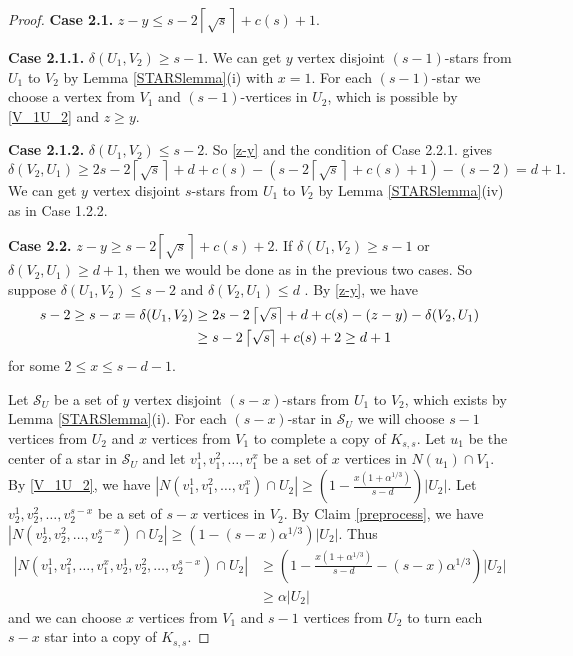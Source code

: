 \documentclass[oneside,12pt]{memoir}
\newcommand{\croot}[1]{\left\lceil\sqrt{#1}\right\rceil}
\begin{document}
\begin{proof}

\textbf{Case 2.1.} $z-y\leq s-2\croot{s}+c(s)+1$.  %

\textbf{Case 2.1.1.} $\delta(U_1,V_2)\geq s-1$. We can get $y$ vertex disjoint $(s-1)$-stars from $U_1$ to $V_2$ by Lemma \ref{STARSlemma}(i) with $x=1$.  For each $(s-1)$-star we choose a vertex from $V_1$ and $(s-1)$-vertices in $U_2$, which is possible by \eqref{V_1U_2} and $z\geq y$.

\textbf{Case 2.1.2.} $\delta(U_1,V_2)\leq s-2$. So \eqref{z-y} and the condition of Case 2.2.1. gives $$\delta(V_2,U_1)\geq 2s-2\croot{s}+d+c(s)-(s-2\croot{s}+c(s)+1)-(s-2)=d+1.$$  We can get $y$ vertex disjoint $s$-stars from $U_1$ to $V_2$ by Lemma \ref{STARSlemma}(iv) as in Case 1.2.2.

\textbf{Case 2.2.} $z-y\geq s-2\croot{s}+c(s)+2$.  If $\delta(U_1,V_2)\geq s-1$ or $\delta(V_2,U_1)\geq d+1$, then we would be done as in the previous two cases.  So suppose $\delta(U_1,V_2)\leq s-2$ and $\delta(V_2,U_1)\leq d$ .  By \eqref{z-y}, we have
\begin{align}
s-2\geq s-x=\delta(U_1,V_2)&\geq 2s-2\croot{s}+d+c(s)-(z-y)-\delta(V_2, U_1)\label{s-x} \\
&\geq s-2\croot{s}+c(s)+2\geq d+1 \notag
\end{align}
for some $2\leq x\leq s-d-1$.

Let $\mathcal{S}_U$ be a set of $y$ vertex disjoint $(s-x)$-stars from $U_1$ to $V_2$, which exists by Lemma \ref{STARSlemma}(i).  For each $(s-x)$-star in $\mathcal{S}_U$ we will choose $s-1$ vertices from $U_2$ and $x$ vertices from $V_1$ to complete a copy of $K_{s,s}$. Let $u_1$ be the center of a star in $\mathcal{S}_U$ and let $v_1^1,v_1^2,\dots, v_1^x$ be a set of $x$ vertices in $N(u_1)\cap V_1$. By \eqref{V_1U_2}, we have $|N(v_1^1, v_1^2, \dots, v_1^x)\cap U_2|\geq \left(1-\frac{x(1+\alpha^{1/3})}{s-d}\right)|U_2|$.  Let $v_2^1,v_2^2,\dots, v_2^{s-x}$ be a set of $s-x$ vertices in $V_2$. By Claim \ref{preprocess}, we have $|N(v_2^1, v_2^2,\dots,v_2^{s-x})\cap U_2|\geq (1-(s-x)\alpha^{1/3})|U_2|$.  Thus 
\begin{align*}
|N(v_1^1, v_1^2, \dots, v_1^x,v_2^1,v_2^2,\dots, v_2^{s-x})\cap U_2|&\geq \left(1-\frac{x(1+\alpha^{1/3})}{s-d}-(s-x)\alpha^{1/3}\right)|U_2|\\ &\geq \alpha|U_2|
\end{align*}
and we can choose $x$ vertices from $V_1$ and $s-1$ vertices from $U_2$ to turn each $s-x$ star into a copy of $K_{s,s}$.


\end{proof}
\end{document}
